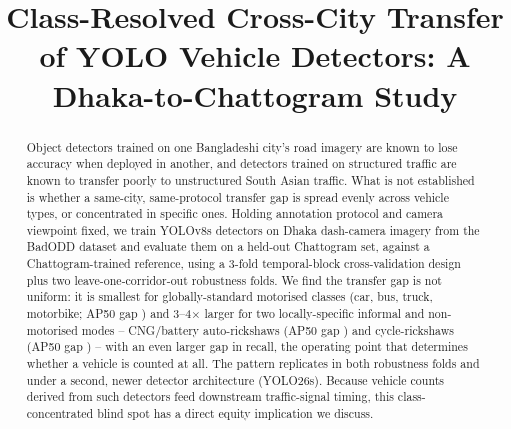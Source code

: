 \documentclass[conference,a4paper]{IEEEtran}
\begin{document}
\title{Class-Resolved Cross-City Transfer of YOLO Vehicle Detectors: A Dhaka-to-Chattogram Study}

\author{
}

\maketitle

\begin{abstract}
Object detectors trained on one Bangladeshi city's road imagery are known to lose
accuracy when deployed in another, and detectors trained on structured traffic are
known to transfer poorly to unstructured South Asian traffic. What is not established
is whether a same-city, same-protocol transfer gap is spread evenly across vehicle
types, or concentrated in specific ones. Holding annotation protocol and camera
viewpoint fixed, we train YOLOv8s detectors on Dhaka dash-camera imagery from the
BadODD dataset and evaluate them on a held-out Chattogram set, against a
Chattogram-trained reference, using a 3-fold temporal-block cross-validation design
plus two leave-one-corridor-out robustness folds. We find the transfer gap is not
uniform: it is smallest for globally-standard motorised classes (car, bus, truck,
motorbike; AP50 gap \GapFormalMotorised) and 3--4$\times$ larger
for two locally-specific informal and non-motorised modes -- CNG/battery
auto-rickshaws (AP50 gap \GapInformalMotorised) and cycle-rickshaws (AP50 gap
\GapNonMotorised) -- with an even larger gap in recall, the operating point that
determines whether a vehicle is counted at all. The pattern replicates in both
robustness folds and under a second, newer detector architecture (YOLO26s). Because vehicle counts derived from such detectors feed
downstream traffic-signal timing, this class-concentrated blind spot has a
direct equity implication we discuss.
\end{abstract}
\end{document}

